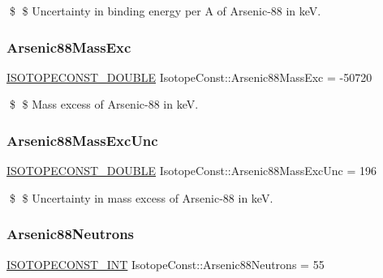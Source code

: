 \$ \$ Uncertainty in binding energy per A of Arsenic-\/88 in keV. \mbox{\label{group___isotope_const-_arsenic-_as88_ga4738115ac1ca8b2cb3cc28bbb4a37023}} 
\subsubsection{\texorpdfstring{Arsenic88\+Mass\+Exc}{Arsenic88MassExc}}
{\footnotesize\ttfamily \mbox{\hyperlink{group___isotope_const-_macros_ga8f45a7272ce02c0b4c65c44636ed719a}{I\+S\+O\+T\+O\+P\+E\+C\+O\+N\+S\+T\+\_\+\+D\+O\+U\+B\+LE}} Isotope\+Const\+::\+Arsenic88\+Mass\+Exc = -\/50720}

\$ \$ Mass excess of Arsenic-\/88 in keV. \mbox{\label{group___isotope_const-_arsenic-_as88_ga73609556b781dca8b20da0f55040770f}} 
\subsubsection{\texorpdfstring{Arsenic88\+Mass\+Exc\+Unc}{Arsenic88MassExcUnc}}
{\footnotesize\ttfamily \mbox{\hyperlink{group___isotope_const-_macros_ga8f45a7272ce02c0b4c65c44636ed719a}{I\+S\+O\+T\+O\+P\+E\+C\+O\+N\+S\+T\+\_\+\+D\+O\+U\+B\+LE}} Isotope\+Const\+::\+Arsenic88\+Mass\+Exc\+Unc = 196}

\$ \$ Uncertainty in mass excess of Arsenic-\/88 in keV. \mbox{\label{group___isotope_const-_arsenic-_as88_ga02a341ac140f625dc6d72df604cc28e2}} 
\subsubsection{\texorpdfstring{Arsenic88\+Neutrons}{Arsenic88Neutrons}}
{\footnotesize\ttfamily \mbox{\hyperlink{group___isotope_const-_macros_ga5f18360b3e99483a35c32d789e62621c}{I\+S\+O\+T\+O\+P\+E\+C\+O\+N\+S\+T\+\_\+\+I\+NT}} Isotope\+Const\+::\+Arsenic88\+Neutrons = 55}

